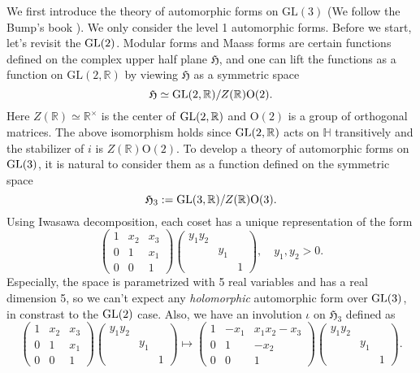 We first introduce the theory of automorphic forms on $\mathrm{GL}(3)$ (We follow the Bump's book \cite{bump2006automorphic}).
We only consider the level 1 automorphic forms.
Before we start, let's revisit the $\operatorname{\mathrm{GL}}(2)$.
Modular forms and Maass forms are certain functions defined on the complex upper half plane $\mathfrak{H}$, and one can lift the functions as a function on $\mathrm{GL}(2, \mathbb{R})$ by viewing $\mathfrak{H}$ as a symmetric space
$$
\mathfrak{H} \simeq  \operatorname{\mathrm{GL}}(2, \mathbb{R})/Z(\mathbb{R})\mathrm{O}(2).
$$
Here $Z(\mathbb{R}) \simeq \mathbb{R}^{\times}$ is the center of $\operatorname{\mathrm{GL}}(2, \mathbb{R})$ and $\mathrm{O}(2)$ is a group of orthogonal matrices. 
The above isomorphism holds since $\operatorname{\mathrm{GL}}(2, \mathbb{R})$ acts on $\mathbb{H}$ transitively and the stabilizer of $i$ is $Z(\mathbb{R})\mathrm{O}(2)$.
To develop a theory of automorphic forms on $\operatorname{\mathrm{GL}}(3)$, it is natural to consider them as a function defined on the symmetric space 
$$
    \mathfrak{H}_{3} := \operatorname{\mathrm{GL}}(3,\mathbb{R}) / Z(\mathbb{R})\mathrm{O}(3).
$$
Using Iwasawa decomposition, each coset has a unique representation of the form 
$$
\begin{pmatrix} 1 & x_{2} & x_{3} \\ 0 & 1 & x_{1} \\ 0 & 0 & 1 \end{pmatrix} \begin{pmatrix}
y_{1}y_{2} & & \\ & y_{1} & \\ & & 1
\end{pmatrix}, \quad y_{1}, y_{2} > 0.
$$
Especially, the space is parametrized with 5 real variables and has a real dimension 5, so we can't expect any \emph{holomorphic} automorphic form over $\operatorname{\mathrm{GL}}(3)$, in constrast to the $\operatorname{\mathrm{GL}}(2)$ case.
Also, we have an involution $\iota$ on $\mathfrak{H}_{3}$ defined as 
$$
\begin{pmatrix} 1 & x_{2} & x_{3} \\ 0 & 1 & x_{1} \\ 0 & 0 & 1 \end{pmatrix} \begin{pmatrix}
y_{1}y_{2} & & \\ & y_{1} & \\ & & 1
\end{pmatrix} \mapsto
\begin{pmatrix} 1 & -x_{1} & x_{1}x_{2} - x_{3} \\ 0 & 1 & -x_{2} \\ 0 & 0 & 1 \end{pmatrix} \begin{pmatrix}
y_{1}y_{2} & & \\ & y_{1} & \\ & & 1
\end{pmatrix}.
$$

